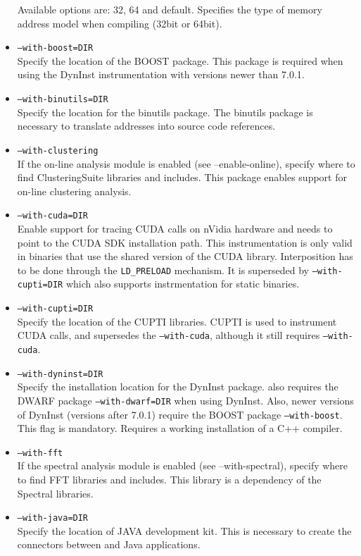 \begin{itemize}
	Available options are: 32, 64 and default. Specifies the type of memory address model when compiling (32bit or 64bit).
	\item {\tt --with-boost=DIR} \\
	Specify the location of the BOOST package. This package is required when using the DynInst instrumentation with versions newer than 7.0.1.
	\item {\tt --with-binutils=DIR} \\
	Specify the location for the binutils package. The binutils package is necessary to translate addresses into source code references.
        \item {\tt --with-clustering} \\
        If the on-line analysis module is enabled (see --enable-online), specify where to find ClusteringSuite libraries and includes. This package enables support for on-line clustering analysis.
	\item {\tt --with-cuda=DIR} \\
	Enable support for tracing CUDA calls on nVidia hardware and needs to point to the CUDA SDK installation path. This instrumentation is only valid in binaries that use the shared version of the CUDA library. Interposition has to be done through the {\tt LD\_PRELOAD} mechanism. It is superseded by {\tt --with-cupti=DIR} which also supports instrmentation for static binaries.
	\item {\tt --with-cupti=DIR} \\
	Specify the location of the CUPTI libraries. CUPTI is used to instrument CUDA calls, and supersedes the {\tt --with-cuda}, although it still requires {\tt --with-cuda}.
	\item {\tt --with-dyninst=DIR} \\
	Specify the installation location for the DynInst package. \TRACE also requires the DWARF package {\tt --with-dwarf=DIR} when using DynInst. Also, newer versions of DynInst (versions after 7.0.1) require the BOOST package {\tt --with-boost}. This flag is mandatory. Requires a working installation of a C++ compiler.
        \item {\tt --with-fft} \\
        If the spectral analysis module is enabled (see --with-spectral), specify where to find FFT libraries and includes. This library is a dependency of the Spectral libraries.
	\item {\tt --with-java=DIR} \\
	Specify the location of JAVA development kit. This is necessary to create the connectors between \TRACE and Java applications.

\end{itemize}
